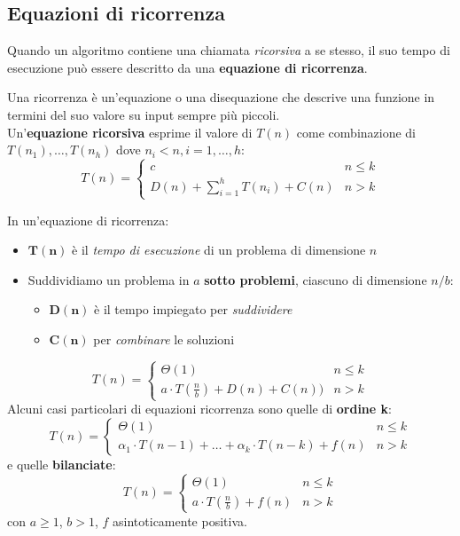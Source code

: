 \subsection{Equazioni di ricorrenza}
Quando un algoritmo contiene una chiamata \emph{ricorsiva} a se stesso, il suo tempo di esecuzione può essere descritto da una \textbf{equazione di ricorrenza}.
\begin{definition}[Ricorrenza]
	Una ricorrenza è un'equazione o una disequazione che descrive una funzione in termini del suo valore su input sempre più piccoli. \\
	Un'\textbf{equazione ricorsiva} esprime il valore di $T(n)$ come combinazione di $T(n_1), \ldots, T(n_h)$ dove $n_i < n, i=1,\ldots,h$:
	\begin{equation}
		T(n)=\begin{cases}
			c & n \leq k \\
			D(n) + \sum\limits_{i=1}^{h} T(n_i)+C(n) & n > k
		\end{cases}
	\end{equation}
\end{definition}
In un'equazione di ricorrenza:
\begin{itemize}
	\item $\mathbf{T(n)}$ è il \emph{tempo di esecuzione} di un problema di dimensione $n$
	\item Suddividiamo un problema in $a$ \textbf{sotto problemi}, ciascuno di dimensione $n/b$:
	\begin{itemize}
		\item $\mathbf{D(n)}$ è il tempo impiegato per \emph{suddividere} 
		\item $\mathbf{C(n)}$ per \emph{combinare} le soluzioni
	\end{itemize}
\end{itemize}
\begin{equation}
	T(n)=\begin{cases}
		\Theta(1) & n \leq k \\
		a \cdot T(\frac{n}{b}) + D(n) + C(n)) & n >k
	\end{cases}
\end{equation}
Alcuni casi particolari di equazioni ricorrenza sono quelle di \textbf{ordine k}:
\begin{equation}
	T(n)=\begin{cases}
		\Theta(1) & n \leq k \\
		\alpha_1 \cdot T(n-1) + \ldots + \alpha_k \cdot T(n-k) + f(n) & n >k
	\end{cases}
\end{equation}
e quelle \textbf{bilanciate}:
\begin{equation}
	T(n)=\begin{cases}
		\Theta(1) & n \leq k \\
		a \cdot T(\frac{n}{b}) + f(n) & n >k
	\end{cases}
\end{equation}
con $a \geq 1$, $b > 1$, $f$ asintoticamente positiva.

